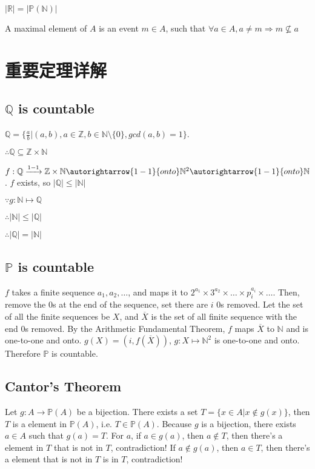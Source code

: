 \documentclass[12pt,a4paper]{ctexrep}
\begin{document}
$|\mathbb{R}| = |\mathbb{P}(\mathbb{N})|$

A maximal element of $A$ is an event $m \in A$, such that $\forall a \in A, a \neq m \Rightarrow m \nsubseteq a$

\section{重要定理详解}
\subsection{$\mathbb{Q}$ is countable} 
$\mathbb{Q} = \{\frac{a}{b}|(a,b),a \in \mathbb{Z},b\in \mathbb{N}\setminus\{0\},gcd(a,b) = 1\}$. 

$\therefore \mathbb{Q} \subseteq \mathbb{Z}\times \mathbb{N}$

$f: \mathbb{Q}\xrightarrow{1-1}\mathbb{Z}\times\mathbb{N}\autorightarrow{1-1}{onto}\mathbb{N}^2\autorightarrow{1-1}{onto}\mathbb{N}$. $f$ exists, so $|\mathbb{Q}|\leqslant|\mathbb{N}|$

$\because g:\mathbb{N}\mapsto \mathbb{Q}$

$\therefore |\mathbb{N}|\leqslant|\mathbb{Q}|$

$\therefore |\mathbb{Q}| = |\mathbb{N}|$
\subsection{$\mathbb{P}$ is countable}
$f$ takes a finite sequence $a_1,a_2,\dots$, and maps it to $2^{a_1}\times3^{a_2}\times\dots\times p_i^{a_i} \times\dots$. Then, remove the 0s at the end of the sequence, set there are $i$ 0s removed. Let the set of all the finite sequences be $X$, and $\overline{X}$ is the set of all finite sequence with the end 0s removed. By the Arithmetic Fundamental Theorem, $f$ maps $\overline{X}$ to $\mathbb{N}$ and is one-to-one and onto. $g(X) = (i,f(\overline{X}))$, $g:X \mapsto \mathbb{N}^2$ is one-to-one and onto. Therefore $\mathbb{P}$ is countable.

\subsection{Cantor's Theorem}
Let $g: A \rightarrow \mathbb{P}(A)$ be a bijection. There exists a set $T=\{x \in A| x \notin g(x)\}$, then $T$ is a element in $\mathbb{P}(A)$, i.e. $T \in \mathbb{P}(A)$. Because $g$ is a bijection, there exists $a\in A$ such that $g(a)=T$. For $a$, if $a \in g(a)$, then $a \notin T$, then there's a element in $T$ that is not in $T$, contradiction! If $a \notin g(a)$, then $a \in T$, then there's a element that is not in $T$ is in $T$, contradiction!
\end{document}
